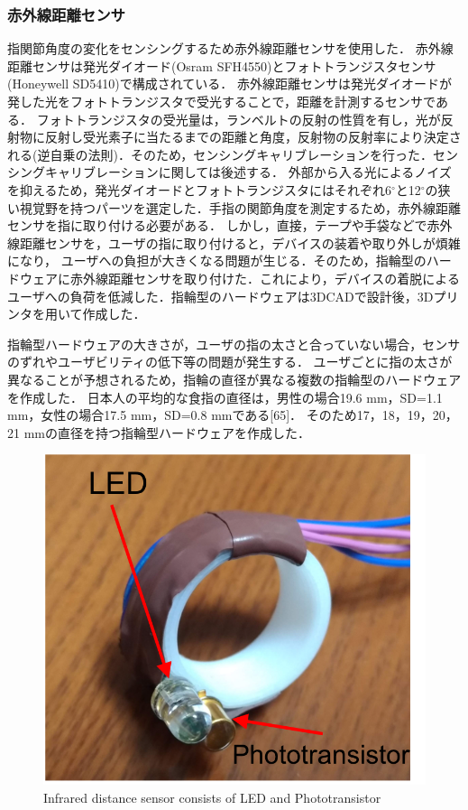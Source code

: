 \subsubsection*{赤外線距離センサ}
指関節角度の変化をセンシングするため赤外線距離センサを使用した．
赤外線距離センサは発光ダイオード(Osram SFH4550)とフォトトランジスタセンサ(Honeywell SD5410)で構成されている．
赤外線距離センサは発光ダイオードが発した光をフォトトランジスタで受光することで，距離を計測するセンサである．
フォトトランジスタの受光量は，ランベルトの反射の性質を有し，光が反射物に反射し受光素子に当たるまでの距離と角度，反射物の反射率により決定される(逆自乗の法則)．そのため，センシングキャリブレーションを行った．センシングキャリブレーションに関しては後述する．
外部から入る光によるノイズを抑えるため，発光ダイオードとフォトトランジスタにはそれぞれ6$^\circ$と12$^\circ$の狭い視覚野を持つパーツを選定した．手指の関節角度を測定するため，赤外線距離センサを指に取り付ける必要がある．
しかし，直接，テープや手袋などで赤外線距離センサを，ユーザの指に取り付けると，デバイスの装着や取り外しが煩雑になり，
ユーザへの負担が大きくなる問題が生じる．そのため，指輪型のハードウェアに赤外線距離センサを取り付けた．これにより，デバイスの着脱によるユーザへの負荷を低減した．指輪型のハードウェアは3DCADで設計後，3Dプリンタを用いて作成した．

指輪型ハードウェアの大きさが，ユーザの指の太さと合っていない場合，センサのずれやユーザビリティの低下等の問題が発生する．
ユーザごとに指の太さが異なることが予想されるため，指輪の直径が異なる複数の指輪型のハードウェアを作成した．
日本人の平均的な食指の直径は，男性の場合19.6 mm，SD=1.1 mm，女性の場合17.5 mm，SD=0.8 mmである[65]．
そのため17，18，19，20，21 mmの直径を持つ指輪型ハードウェアを作成した．

\begin{figure}[H]
  \centering
  \includegraphics[width=0.8\linewidth]{fig/ring_led}
  \caption{Infrared distance sensor consists of LED and Phototransistor}
  \label{fig:distance sensor}
\end{figure}

